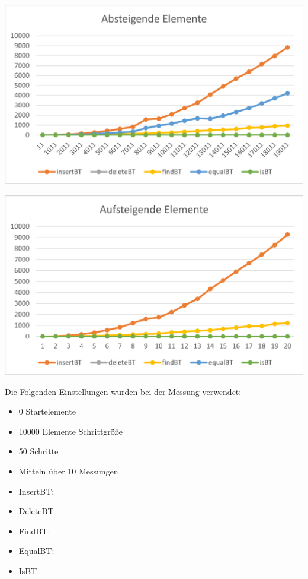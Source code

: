 \documentclass[11pt]{article}
\begin{document}
    \begin{center}
        \includegraphics[width=0.9\columnwidth] {ZeitAb.pdf}
    \end{center}
    \begin{center}
        \includegraphics[width=0.9\columnwidth] {ZeitAuf.pdf}
    \end{center}

    Die Folgenden Einstellungen wurden bei der Messung verwendet:
    \begin{itemize}
        \item 0 Startelemente
        \item 10000 Elemente Schrittgröße
        \item 50 Schritte
        \item Mitteln über 10 Messungen
    \end{itemize}

    \begin{itemize}
        \item InsertBT:

        \item DeleteBT

        \item FindBT:

        \item EqualBT:

        \item IsBT:
    \end{itemize}
\end{document}
